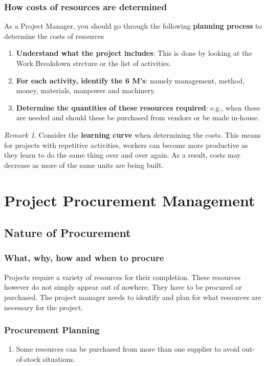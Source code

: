 \documentclass[math,code]{amznotes}
\theoremstyle{remark}
\newtheorem*{remark}{Remark}
\begin{document}
\subsection{How costs of resources are determined}
As a Project Manager, you should go through the following \textbf{planning process} to determine the costs of resources
\begin{enumerate}
    \item \textbf{Understand what the project includes}: This is done by looking at the Work Breakdown strcture or the list of activities.
    \item \textbf{For each activity, identify the 6 M's}: namely management, method, money, materials, manpower and machinery.
    \item \textbf{Determine the quantities of these resources required}: e.g., when these are needed and should these be purchased from vendors or be made in-house.
\end{enumerate}
\begin{notebox}
    \begin{remark}
        Consider the \textbf{learning curve} when determining the costs. This means for projects with repetitive activities, workers can become more productive as they learn to do the same thing over and over again. As a result, costs may decrease as more of the same units are being built.
    \end{remark}
\end{notebox}

\chapter{Project Procurement Management}
\section{Nature of Procurement}
\subsection{What, why, how and when to procure}
Projects require a variety of resources for their completion. These resources however do not simply appear out of nowhere. They have to be procured or purchased. The project manager needs to identify and plan for what resources are necessary for the project.

\subsection{Procurement Planning}
\begin{enumerate}
    \item Some resources can be purchased from more than one supplier to avoid out-of-stock situations.
\end{enumerate}
\end{document}
